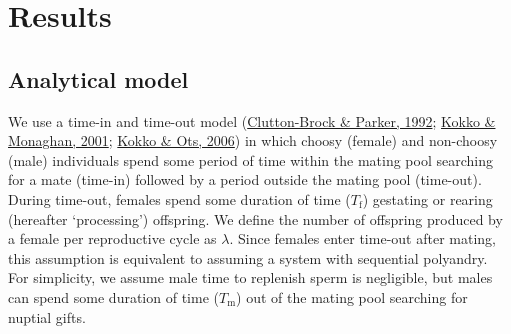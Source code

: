 \documentclass[
]{article}
\begin{document}
\hypertarget{results}{%
\section{Results}\label{results}}

\hypertarget{analytical-model}{%
\subsection{Analytical model}\label{analytical-model}}

We use a time-in and time-out model
(\protect\hyperlink{ref-Clutton-Brock1992}{Clutton-Brock \& Parker,
1992}; \protect\hyperlink{ref-Kokko2001}{Kokko \& Monaghan, 2001};
\protect\hyperlink{ref-Kokko2006}{Kokko \& Ots, 2006}) in which choosy
(female) and non-choosy (male) individuals spend some period of time
within the mating pool searching for a mate (time-in) followed by a
period outside the mating pool (time-out). During time-out, females
spend some duration of time (\(T_{\mathrm{f}}\)) gestating or rearing
(hereafter `processing') offspring. We define the number of offspring
produced by a female per reproductive cycle as \(\lambda\). Since
females enter time-out after mating, this assumption is equivalent to
assuming a system with sequential polyandry. For simplicity, we assume
male time to replenish sperm is negligible, but males can spend some
duration of time (\(T_{\mathrm{m}}\)) out of the mating pool searching
for nuptial gifts.
\end{document}
